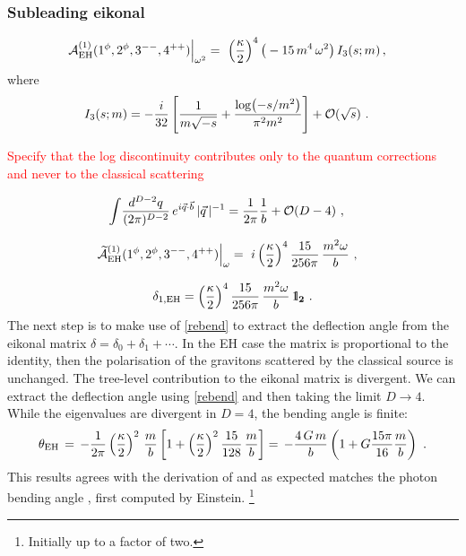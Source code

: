 \documentclass[a4paper,11pt]{article}
\numberwithin{equation}{section}
\newcommand{\cO}{\mathcal{O}}
\def\uno{\mbox{1 \kern-.59em {\rm l}}}
\begin{document}
\subsubsection{Subleading eikonal}

\begin{align}
    \left.\mathcal{A}_{\rm EH}^{(1)} (1^\phi, 2^\phi, 3^{--}, 4^{++})\right|_{\omega^2} & = \  \left({  \kappa\over 2} \right)^4 \big( - 15 \, m^4 \, \omega^2\big) \, I_3 (s; m)  \, ,
\end{align}
where 
\begin{align} 
I_3 (s; m) & = - {i\over 32} \left[ {1\over m  \sqrt{ -s} } + { \log ( - {s/m^2} ) \over \pi^2 m^2} \right] + \cO (\sqrt{s} )\ . 
\end{align}

\textcolor{red}{Specify that the log discontinuity contributes only to the quantum corrections and never to the classical scattering}

\begin{align}
    \int\!{d^{D-2}q\over (2\pi)^{D-2}}\, e^{i\vec{q} \cdot \vec{b}}  \, |\vec{q}\, |^{-1} & =  {1\over 2 \pi} {1\over b} + \cO (D-4)
    \ , 
\end{align}

\begin{align}
\left.\widetilde{\mathcal{A}}_{\rm EH}^{(1)} (1^\phi, 2^\phi, 3^{--}, 4^{++})\right|_{\omega} & = \ i \left({  \kappa\over 2} \right)^4 \frac{15}{256\pi} \, \frac{m^2 \omega}{b}
\ ,
\end{align}

\begin{align}\label{eq:EHgravitonsubleading}
    \delta_{1,{\rm EH}} = \left({  \kappa\over 2} \right)^4 \frac{15}{256\pi} \, {m^2 \omega\over b}\,  \bf{\uno}_2 \ .
\end{align}
%
The next step is to  make use of \eqref{rebend} to extract the deflection  angle from the eikonal matrix $\delta = \delta_0 + \delta_1 + \cdots $. In the EH case the matrix is proportional to the identity, then the polarisation of the gravitons scattered by the classical source is unchanged. The tree-level contribution to the eikonal matrix is divergent. We can extract the deflection angle using \eqref{rebend} and then taking the limit $D\to 4$. While the eigenvalues are divergent in $D=4$, the bending angle is finite: 
\begin{equation}
        \theta_{\rm EH}  \, = \, - {1\over 2 \pi} \left({\kappa\over 2}\right)^2 \, \frac{m}{b}\left[1 + \left({\kappa\over 2}\right)^2 \frac{15}{128}\, \frac{m}{b} \right]
        =\, - \frac{4\, G\, m}{b} \left(1 + G\frac{15\pi}{16} \frac{m}{b} \right)\  . 
\end{equation}
This results agrees with the derivation of \cite{Chi:2019owc} and as expected matches the  photon bending angle 
\cite{Bjerrum-Bohr:2014zsa, Bjerrum-Bohr:2016hpa}, first computed by Einstein.%
\footnote{Initially up to a factor of two.} 
\end{document}
